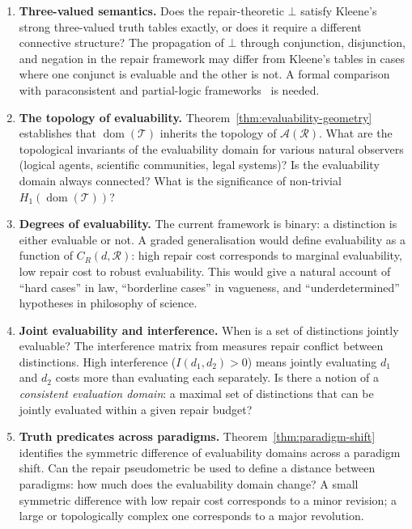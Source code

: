 \documentclass[12pt, oneside]{article}
\theoremstyle{plain}
\theoremstyle{definition}
\theoremstyle{remark}
\newcommand{\CR}{C_{\!R}}
\newcommand{\AO}{\mathcal{A}}
\newcommand{\Tsub}{\mathcal{T}}
\newcommand{\Undef}{\mathord{\perp}} %
\begin{document}
\begin{enumerate}

  \item \textbf{Three-valued semantics.}\;
    Does the repair-theoretic $\Undef$ satisfy Kleene's strong
    three-valued truth tables exactly, or does it require a
    different connective structure?
    The propagation of $\Undef$ through conjunction, disjunction,
    and negation in the repair framework may differ from Kleene's
    tables in cases where one conjunct is evaluable and the other
    is not.
    A formal comparison with paraconsistent and partial-logic
    frameworks~\cite{Kleene1952} is needed.

  \item \textbf{The topology of evaluability.}\;
    Theorem~\ref{thm:evaluability-geometry} establishes that
    $\operatorname{dom}(\Tsub)$ inherits the topology of
    $\AO(\mathcal{R})$.
    What are the topological invariants of the evaluability domain
    for various natural observers (logical agents, scientific
    communities, legal systems)?
    Is the evaluability domain always connected?
    What is the significance of non-trivial $H_1(\operatorname{dom}(\Tsub))$?

  \item \textbf{Degrees of evaluability.}\;
    The current framework is binary: a distinction is either
    evaluable or not.
    A graded generalisation would define evaluability as a function
    of $\CR(d, \mathcal{R})$: high repair cost corresponds to
    marginal evaluability, low repair cost to robust evaluability.
    This would give a natural account of ``hard cases'' in law,
    ``borderline cases'' in vagueness, and ``underdetermined''
    hypotheses in philosophy of science.

  \item \textbf{Joint evaluability and interference.}\;
    When is a set of distinctions jointly evaluable?
    The interference matrix from \cite{Flyxion2026a} measures
    repair conflict between distinctions.
    High interference ($I(d_1, d_2) > 0$) means jointly evaluating
    $d_1$ and $d_2$ costs more than evaluating each separately.
    Is there a notion of a \emph{consistent evaluation domain}:
    a maximal set of distinctions that can be jointly evaluated
    within a given repair budget?

  \item \textbf{Truth predicates across paradigms.}\;
    Theorem~\ref{thm:paradigm-shift} identifies the symmetric
    difference of evaluability domains across a paradigm shift.
    Can the repair pseudometric be used to define a distance between
    paradigms: how much does the evaluability domain change?
    A small symmetric difference with low repair cost corresponds
    to a minor revision; a large or topologically complex one
    corresponds to a major revolution.

\end{enumerate}
\end{document}
